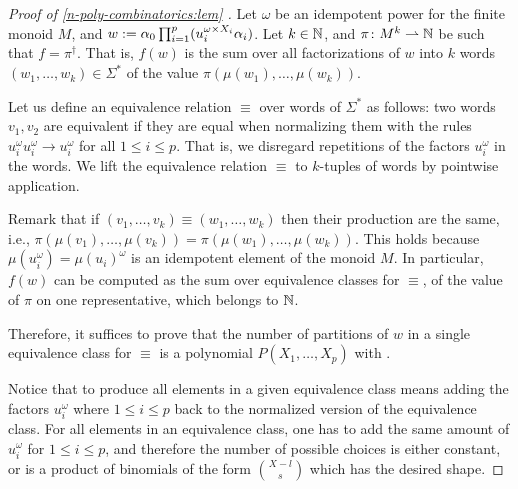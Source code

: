 \begin{proof}[Proof of
    \cref{n-poly-combinatorics:lem}
    ]

    Let $\omega$ be an idempotent power for the finite monoid $M$,
    and
    $w \mathrel{:=} \alpha_0 \prod_{i = 1}^p (u_i^{\omega \times X_i} \alpha_i)$.
    Let $k \in \mathbb{N}$, and $\pi \colon M^k \rightharpoonup \mathbb{N}$ be such that
    $f = \pi^\dagger$. That is, 
    $f(w)$ is the sum over all factorizations of $w$
    into $k$ words $(w_1, \dots, w_k) \in \Sigma^*$
    of the value $\pi(\mu(w_1), \dots, \mu(w_k))$.

    Let us define an equivalence relation $\equiv$ over words of
    $\Sigma^*$ as follows: two words $v_1, v_2$ are equivalent if they are
    equal when normalizing them with the rules $u_i^{\omega} u_i^{\omega} \to
    u_i^{\omega}$ for all $1 \leq i \leq p$. That is, we disregard
    repetitions of the factors $u_i^{\omega}$ in the words.
    We lift the equivalence relation $\equiv$ to $k$-tuples of
    words by pointwise application.

    Remark that if $(v_1, \dots, v_k) \equiv (w_1, \dots, w_k)$ then their
    production are the same, i.e., $\pi(\mu(v_1), \dots, \mu(v_k)) =
    \pi(\mu(w_1), \dots, \mu(w_k))$. This holds because $\mu(u_i^\omega) =
    \mu(u_i)^\omega$ is an idempotent element of the monoid $M$. In particular,
    $f(w)$ can be computed as the sum over equivalence classes for $\equiv$, of
    the value of $\pi$ on one representative, which belongs to $\mathbb{N}$.

    Therefore, it suffices to prove that the number of partitions of $w$ in a
    single equivalence class for $\equiv$ is a polynomial $P(X_1, \dots, X_p)$
    with  .

    Notice that to produce all elements in a given equivalence class
    means adding the factors $u_i^\omega$ where $1 \leq i \leq p$
    back to the normalized version
    of the equivalence class. For all elements in an equivalence class,
    one has to add the same amount of $u_i^\omega$ for $1 \leq i \leq p$,
    and therefore the number of possible choices
    is either constant, or 
    is a product of binomials of the form $\binom{X - l}{s}$
    which has the desired shape.
\end{proof}

